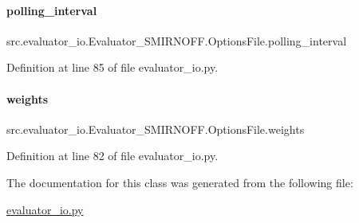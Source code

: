 \paragraph{\texorpdfstring{polling\+\_\+interval}{polling\_interval}}
{\footnotesize\ttfamily src.\+evaluator\+\_\+io.\+Evaluator\+\_\+\+S\+M\+I\+R\+N\+O\+F\+F.\+Options\+File.\+polling\+\_\+interval}



Definition at line 85 of file evaluator\+\_\+io.\+py.

\mbox{\label{classsrc_1_1evaluator__io_1_1Evaluator__SMIRNOFF_1_1OptionsFile_ad5315f81d0b3d27e9da56ecabb7685f5}} 
\paragraph{\texorpdfstring{weights}{weights}}
{\footnotesize\ttfamily src.\+evaluator\+\_\+io.\+Evaluator\+\_\+\+S\+M\+I\+R\+N\+O\+F\+F.\+Options\+File.\+weights}



Definition at line 82 of file evaluator\+\_\+io.\+py.



The documentation for this class was generated from the following file\+:\begin{DoxyCompactItemize}
\item 
\hyperlink{evaluator__io_8py}{evaluator\+\_\+io.\+py}\end{DoxyCompactItemize}

